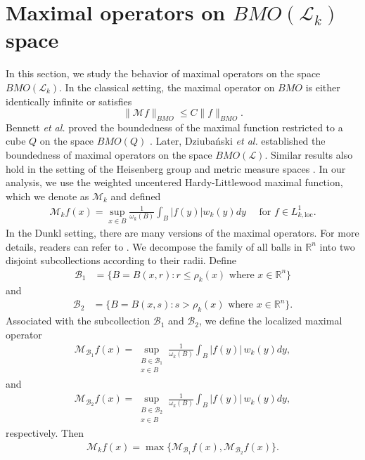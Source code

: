 \documentclass[11pt, reqno]{amsproc}
\theoremstyle{definition}
\theoremstyle{remark}
\numberwithin{equation}{section}
\begin{document}
\section{Maximal operators on $BMO(\mathcal{L}_k)$ space}\label{S:5}
In this section, we study the behavior of maximal operators on the space $BMO(\mathcal{L}_k)$. In the classical setting, the maximal operator on $BMO$ is either identically infinite or satisfies
\[
\|\mathcal{M}f\|_{BMO} \leq C \|f\|_{BMO}.
\]
Bennett \textit{et al.} proved the boundedness of the maximal function restricted to a cube $Q$ on the space $BMO(Q)$ \cite{Bennett}. Later, Dziuba\'nski \textit{et al.} established the boundedness of maximal operators on the space $BMO(\mathcal{L})$. Similar results also hold in the setting of the Heisenberg group \cite{Lin} and metric measure spaces \cite{Dafni-2012}.
 In our analysis, we use the weighted uncentered Hardy-Littlewood maximal function,  which we denote as $\mathcal{M}_k$ and defined 
 \begin{align*}
     \mathcal{M}_kf(x) =  \sup\limits_{x\in B} \frac{1}{\omega_k(B)} \int_{B}|f(y)|w_k(y)dy  \quad \text{ for } f\in L_{k, \text{loc}}^1 .
 \end{align*}
In the Dunkl setting, there are many versions of the maximal operators. For more details, readers can refer to \cite{Almeida}.
 We decompose the family of all balls in $\mathbb{R}^n$ into two disjoint subcollections according to their radii. Define
     \begin{align*}
         \mathcal{B}_1 & = \{B= B(x, r): r \leq {\rho_k}(x) \text{ where } x\in \mathbb{R}^n \} 
         \end{align*} and
         \begin{align*}
          \mathcal{B}_2 & = \{B= B(x, s): s > {\rho_k}(x) \text{ where } x\in \mathbb{R}^n \}. 
     \end{align*}
Associated with the subcollection $\mathcal{B}_1$ and $\mathcal{B}_2$, we define the localized maximal operator 
\begin{align*}
    \mathcal{M}_{\mathcal{B}_1}f(x) = \sup_{\substack{B \in \mathcal{B}_1 \\ x \in B}} \frac{1}{\omega_k(B)} \int_B |f(y)|\, w_k(y)dy, 
\end{align*}
and 
\begin{align*}
  \mathcal{M}_{\mathcal{B}_2}f(x) = \sup_{\substack{B \in \mathcal{B}_2 \\ x \in B}} \frac{1}{\omega_k(B)} \int_B |f(y)|\, w_k(y)dy, 
\end{align*}
respectively. Then 
\begin{align}\label{maximal functiona}
    \mathcal{M}_k f(x) = \max\{\mathcal{M}_{\mathcal{B}_1}f(x), \mathcal{M}_{\mathcal{B}_2}f(x)\}.
\end{align}
\end{document}
